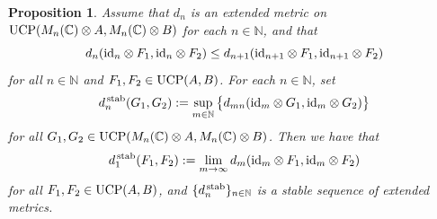 \documentclass[11pt, a4paper, oneside, final, reqno]{amsart}
\newcommand{\bbN}{\mathbb{N}}
\newcommand{\bbC}{\mathbb{C}}
\theoremstyle{definition}
\theoremstyle{plain}
\newtheorem{proposition}[definition]{Proposition}
\theoremstyle{remark}
\numberwithin{equation}{section}
\begin{document}
\begin{proposition}\label{StabD}
    Assume that $d_n$ is an extended metric on ${\rm UCP}(M_n(\bbC)\otimes A, M_n(\bbC)\otimes B)$ for each $n \in \bbN$, and that
    \begin{equation}\label{stab-3}
        d_{n}({\rm id}_{n}\otimes F_1, {\rm id}_{n}\otimes F_2)
        \leq  d_{n+1}({\rm id}_{n+1}\otimes F_1, {\rm id}_{n+1}\otimes F_2)
    \end{equation}
    for all $n\in \bbN$ and $F_1, F_2\in{\rm UCP}(A, B)$. For each $n\in \bbN$, set
    \begin{equation}\label{d_n-stab}
        d^{\, \rm stab}_{n}(G_1, G_2) := \sup_{m\in \bbN} \big\{d_{mn}({\rm id}_{m} \otimes G_1, {\rm id}_m\otimes G_2)\big\}
    \end{equation}
    for all $G_1, G_2 \in {\rm UCP}(M_n(\bbC)\otimes A, M_n(\bbC)\otimes B)$. Then we have that
    \begin{equation*}
        d_1^{\, \rm stab}(F_1, F_2) := \lim_{m\to \infty} d_{m}({\rm id}_{m} \otimes F_1, {\rm id}_m\otimes F_2)
    \end{equation*}
    for all $F_1, F_2\in{\rm UCP}(A,B)$, and $\{d^{\, \rm stab}_{n}\}_{n\in \bbN}$ is a stable sequence of extended metrics.
\end{proposition}
\end{document}
